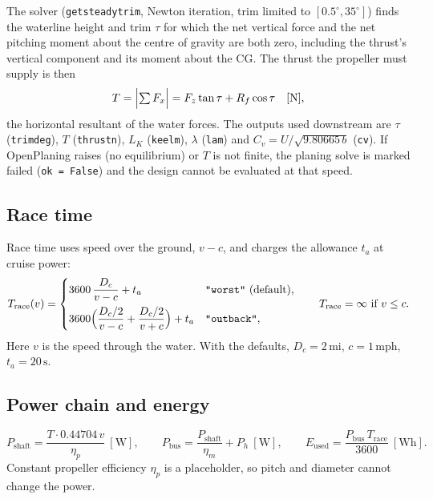 \documentclass[11pt,a4paper]{article}
\renewcommand{\_}{\textunderscore\allowbreak}
\newcommand{\code}[1]{\texttt{#1}}
\newcommand{\Trace}{T_{\mathrm{race}}}
\newcommand{\Pshaft}{P_{\mathrm{shaft}}}
\newcommand{\Pbus}{P_{\mathrm{bus}}}
\newcommand{\Eused}{E_{\mathrm{used}}}
\begin{document}
The solver (\code{get\_steady\_trim}, Newton iteration, trim limited to $[0.5^\circ,35^\circ]$) finds the waterline height and trim
$\tau$ for which the net vertical force and the net pitching moment about the centre of gravity are both zero, including the
thrust's vertical component and its moment about the CG. The thrust the propeller must supply is then
\begin{equation}
  T = \Bigl|\textstyle\sum F_x\Bigr| = F_z\tan\tau + R_f\cos\tau \quad[\mathrm N],
  \label{eq:thrust}
\end{equation}
the horizontal resultant of the water forces. The outputs used downstream are
$\tau$ (\code{trim\_deg}), $T$ (\code{thrust\_n}), $L_K$ (\code{keel\_m}), $\lambda$ (\code{lam}) and
$C_v = U/\sqrt{9.80665\,b}$ (\code{cv}). If OpenPlaning raises (no equilibrium) or $T$ is not finite, the planing solve is marked failed
(\code{ok = False}) and the design cannot be evaluated at that speed.

\subsection{Race time}
Race time uses speed over the ground, $v-c$, and charges the allowance $t_a$ at cruise power:
\begin{equation}
  \Trace(v) =
  \begin{cases}
    3600\,\dfrac{D_c}{v-c} + t_a & \code{"worst"} \ (\text{default}),\\[8pt]
    3600\Bigl(\dfrac{D_c/2}{v-c} + \dfrac{D_c/2}{v+c}\Bigr) + t_a & \code{"outback"},
  \end{cases}
  \qquad \Trace=\infty\ \text{if } v\le c.
  \label{eq:racetime}
\end{equation}
Here $v$ is the speed through the water. With the defaults, $D_c=2\,\mathrm{mi}$, $c=1\,\mathrm{mph}$, $t_a=20\,\mathrm s$.

\subsection{Power chain and energy}
\begin{equation}
  \Pshaft = \frac{T\cdot 0.44704\,v}{\eta_p}\ [\mathrm W],\qquad
  \Pbus = \frac{\Pshaft}{\eta_m} + P_h\ [\mathrm W],\qquad
  \Eused = \frac{\Pbus\,\Trace}{3600}\ [\mathrm{Wh}].
  \label{eq:power}
\end{equation}
Constant propeller efficiency $\eta_p$ is a placeholder, so pitch and diameter cannot change the power.
\end{document}
